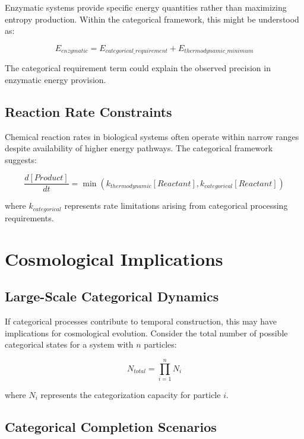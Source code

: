 \documentclass[12pt,a4paper]{article}
\theoremstyle{remark}
\begin{document}
Enzymatic systems provide specific energy quantities rather than maximizing entropy production. Within the categorical framework, this might be understood as:

\begin{equation}
E_{enzymatic} = E_{categorical\_requirement} + E_{thermodynamic\_minimum}
\end{equation}

The categorical requirement term could explain the observed precision in enzymatic energy provision.

\subsection{Reaction Rate Constraints}

Chemical reaction rates in biological systems often operate within narrow ranges despite availability of higher energy pathways. The categorical framework suggests:

\begin{equation}
\frac{d[Product]}{dt} = \min\left(k_{thermodynamic}[Reactant], k_{categorical}[Reactant]\right)
\end{equation}

where $k_{categorical}$ represents rate limitations arising from categorical processing requirements.

\section{Cosmological Implications}

\subsection{Large-Scale Categorical Dynamics}

If categorical processes contribute to temporal construction, this may have implications for cosmological evolution. Consider the total number of possible categorical states for a system with $n$ particles:

\begin{equation}
N_{total} = \prod_{i=1}^{n} N_i
\end{equation}

where $N_i$ represents the categorization capacity for particle $i$.

\subsection{Categorical Completion Scenarios}
\end{document}
